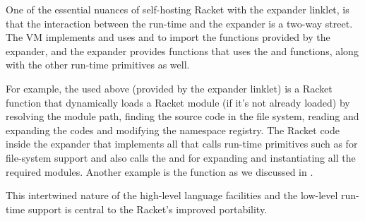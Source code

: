 One of the essential nuances of self-hosting Racket with the expander
linklet, is that the interaction between the run-time and the expander
is a two-way street. The VM implements and uses
 and  to
import the functions provided by the expander, and the expander
provides functions that uses the  and
 functions, along with the other
run-time primitives as well.

For example, the  used above (provided by
the expander linklet) is a Racket function that dynamically loads a
Racket module (if it's not already loaded) by resolving the module
path, finding the source code in the file system, reading and
expanding the codes and modifying the namespace registry. The Racket
code inside the expander that implements all that calls run-time
primitives such as for file-system support and also calls the
 and  for
expanding and instantiating all the required modules. Another example
is the  function as we discussed in
.

This intertwined nature of the high-level language facilities and the
low-level run-time support is central to the Racket's improved
portability.
